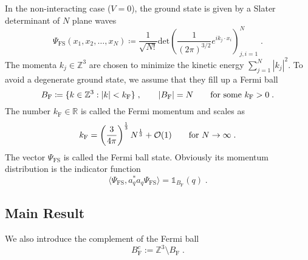 \documentclass[12pt,a4paper]{article}
\numberwithin{equation}{section}
\newcommand{\ZZZ}{\mathbb{Z}}
\newcommand{\Zbb}{\mathbb{Z}}
\newcommand{\1}{\mathbb{I}}
\newcommand{\F}{\mathrm{F}}
\newcommand{\FS}{\mathrm{FS}}
\newcommand{\Rbb}{\mathbb{R}}
\newcommand{\Z}{\mathbb{Z}}
\theoremstyle{plain}
\theoremstyle{definition}
\theoremstyle{remark}
\theoremstyle{plain}
\theoremstyle{definition}
\theoremstyle{remark}
\begin{document}
In the non-interacting case ($ V=0 $), the ground state is given by a Slater determinant of $ N $ plane waves
\begin{equation}
	\Psi_{\FS}(x_1, x_2, \ldots, x_N) \coloneq \frac{1}{\sqrt{N!}}\text{det}\left(\frac{1}{(2\pi)^{3/2}}e^{ik_j\cdot x_i}\right)^N_{j,i=1} \;.
\end{equation}
The momenta $ k_j \in \Zbb^3$ are chosen to minimize the kinetic energy $ \sum_{j=1}^N |k_j|^2 $. To avoid a degenerate ground state, we assume that they fill up a Fermi ball
\begin{equation}
	B_{\F} \coloneq \{ k \in \ZZZ^3 : |k| < k_{\F} \} \;, \qquad
	|B_{\F}| = N \qquad \textnormal{for some } k_{\F} > 0 \;.
\end{equation}
The number $ k_{\F} \in \Rbb$ is called the Fermi momentum and scales as
\begin{equation}
	k_{\F} = \left(\frac{3}{4\pi}\right)^\frac{1}{3}N^\frac{1}{3} + \mathcal{O}(1) \qquad \textnormal{for } N\to \infty \;.
 \end{equation}
The vector $ \Psi_{\FS} $ is called the Fermi ball state. Obviously its momentum distribution is the indicator function
\begin{equation}
	\langle \Psi_{\FS}, a_q^* a_q \Psi_{\FS} \rangle
	= \mathds{1}_{B_{\F}}(q) \;.
\end{equation}


\subsection{Main Result}
\label{subsec:mainresult}

We also introduce the complement of the Fermi ball
\begin{equation}
   B_\text{F}^c := \Zbb^3 \setminus B_\text{F} \;.
\end{equation}
\end{document}
